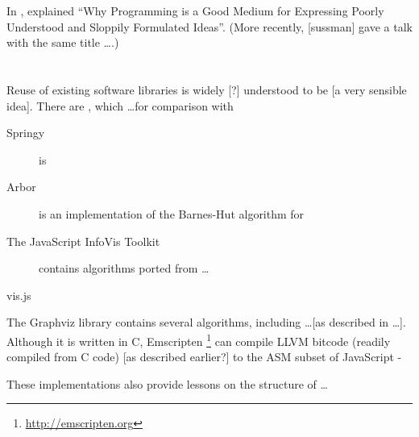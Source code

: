 \documentclass[authoryearcitations]{UoYCSproject}
\begin{document}
In \citeyear{67poorslop}, \citet*{67poorslop} explained ``Why Programming is a Good Medium for Expressing Poorly Understood and Sloppily Formulated Ideas''.
(More recently, [sussman] gave a talk with the same title \ldots {}.)


\section{}

Reuse of existing software libraries is widely [?] understood to be [a very sensible idea]. There are , which \ldots for comparison with 

\begin{description}
    \item[Springy] is
    \item[Arbor] is an implementation of the Barnes-Hut algorithm for 
    \item[The JavaScript InfoVis Toolkit] contains algorithms ported from \ldots
    \item[vis.js]
\end{description}

The Graphviz library contains several algorithms, including \ldots [as described in \ldots]. Although it is written in C, Emscripten \footnote{\url{http://emscripten.org}} can compile LLVM bitcode (readily compiled from C code) [as described earlier?] to the ASM subset of JavaScript -

These implementations also provide lessons on the structure of \ldots





\end{document}
